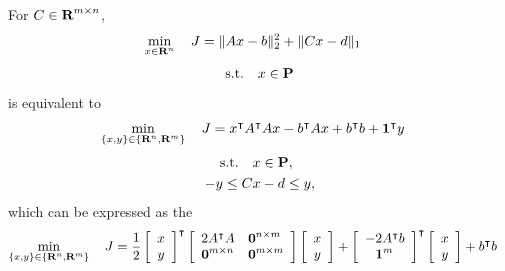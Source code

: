 \documentclass{article}
\begin{document}
    For $C\in\textbf{R}^{m\times n}$,
    \begin{align*}
        \min_{x\in\textbf{R}^n}\quad J & =     \|A x-b\|_2^2
                        +   \|C x - d\|_1
    \end{align*}
    \begin{align*}
        \text{s.t.}\quad x\in\textbf{P}
    \end{align*}
    is equivalent to
    \begin{align*}
    \min_{\{x,y\}\in\{\textbf{R}^n,\textbf{R}^m\}}
    \quad J & =     x^\intercal A^\intercal A x 
                    -   b^\intercal A x
                    +   b^\intercal b
                    +   \textbf{1}^\intercal y
    \end{align*}
    \begin{align*}
        \text{s.t.}\quad &x\in\textbf{P},
        \\
        -y \leq C &x - d \leq y,
    \end{align*}
    which can be expressed as the \QP
    \begin{align*}
        \min_{\{x,y\}\in\{\R^n,\R^m\}} \quad 
        J & = \frac{1}{2}
        \left[\begin{array}{c}
            x   \\
            y
        \end{array}\right]^\tp
        \left[\begin{array}{ll}
            2A^\tp A
        &
            \zeros^{n\times m}
        \\ 
            \zeros^{m\times n}
        &
            \zeros^{m\times m}
        \end{array}\right]
        \left[\begin{array}{c}
            x   \\
            y
        \end{array}\right]
        +
        \left[\begin{array}{l}
            -2 A^\tp b
            \\
            \minus \ones^{m}
        \end{array}\right]^\tp
        \left[\begin{array}{c}
            x   \\
            y
        \end{array}\right]
        +
        b^\tp b
    \end{align*}
\end{document}
